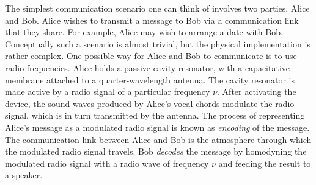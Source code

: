\documentclass{article}
\newcommand\defn[1]{\textsl{#1}}
\begin{document}
The simplest communication scenario one can think of involves two parties, Alice and Bob.  Alice wishes to transmit a message to Bob via a communication link that they share.  For example, Alice may wish to arrange a date with Bob. Conceptually such a scenario is almost trivial, but the physical implementation is rather complex.  One possible way for Alice and Bob to communicate is to use radio frequencies.   Alice holds a passive cavity resonator, with a capacitative membrane attached to a quarter-wavelength antenna.  The cavity resonator is made active by a radio signal of a particular frequency $\nu$.  After activating the device, the sound waves produced by Alice's vocal chords modulate the radio signal, which is in turn transmitted by the antenna. The process of representing Alice's message as a modulated radio signal is known as \defn{encoding} of the message.  The communication link between Alice and Bob is the atmosphere through which the modulated radio signal travels.  Bob \defn{decodes} the message by homodyning the modulated radio signal with a radio wave of frequency $\nu$ and feeding the result to a speaker. 
\end{document}
